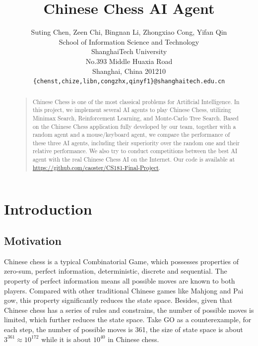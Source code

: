 \documentclass[letterpaper]{article}
\title{Chinese Chess AI Agent}
\author{Suting Chen, Zeen Chi, Bingnan Li, Zhongxiao Cong, Yifan Qin\\
School of Information Science and Technology\\
ShanghaiTech University\\
No.393 Middle Huaxia Road\\
Shanghai, China 201210\\
\texttt{\{chenst,chize,libn,congzhx,qinyf1\}@shanghaitech.edu.cn}
}
\begin{document}
    \maketitle

    \begin{abstract}
        \begin{quote}
            Chinese Chess is one of the most classical problems for Artificial Intelligence.
            In this project, we implement several AI agents to play Chinese Chess, utilizing Minimax Search, Reinforcement Learning, and Monte-Carlo Tree Search.
            Based on the Chinese Chess application fully developed by our team, together with a random agent and a mouse/keyboard agent, we compare the performance of these three AI agents, including their superiority over the random one and their relative performance.
            We also try to conduct competitions between the best AI agent with the real Chinese Chess AI on the Internet.
            Our code is available at \url{https://github.com/caoster/CS181-Final-Project}.
        \end{quote}
    \end{abstract}


    \section{Introduction}\label{sec:introduction}

    \subsection{Motivation}\label{subsec:motivation}
    Chinese chess is a typical Combinatorial Game, which possesses properties of zero-sum, perfect information, deterministic, discrete and sequential.
    The property of perfect information means all possible moves are known to both players.
    Compared with other traditional Chinese games like Mahjong and Pai gow, this property significantly reduces the state space.
    Besides, given that Chinese chess has a series of rules and constrains, the number of possible moves is limited, which further reduces the state space.
    Take GO as a counterexample, for each step, the number of possible moves is 361, the size of state space is about $3^{361}\approx 10^{172}$ while it is about $10^{40}$ in Chinese chess.
    
\end{document}
